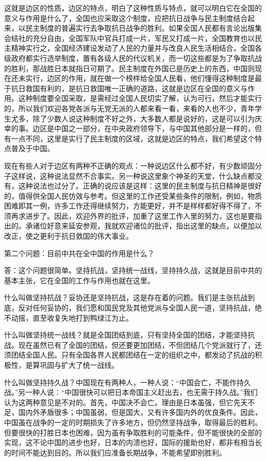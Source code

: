 这就是边区的性质，边区的特点，明白了这种性质与特点，就可以明白它在全国的意义与作用是什么了，全国也应采取这个制度，应把抗日战争与民主制度结合起来，以民主制度的普遍实行去争取抗日战争的胜利。如果全国人民都有言论出版集会结社的充分自由，全国军队中官兵打成一片，军民又打成一片，全国教育也以民主精神实行之，全国经济建设发动了人民的力量并与改良人民生活相结合，全国各级政府都实行选举制度，置有各级人民的代议机关，而一切这些都是为了争取抗战的胜利，那战胜日本就指日可期了。民主制度在外国已是历史上的东西，中国则现在还未实行，边区的作用，就在做一个榜样给全国人民看，他们懂得这种制度是最于抗日救国有利的，是抗日救国唯一正确的道路，这就是边区在全国的意义与作用。这种制度要全国采取，是需经过全国人民切实了解，认为可行，然后才能实行的，所以我们欢迎各党各派与无党无派的人都来看一看，来看的人也不少，青年学生尤多，除了少数人说这种制度不好之外，大多数人都是说好的，这是可以引为庆幸的事。边区是中国之一部分，在中央政府领导下，与中国其他部分是一样的，但有一点不同，这里是实行了民主制度的区域，这就是边区的特点，我们希望这个特点普及于中国。

现在有些人对于边区有两种不正确的观点：一种说边区什么都不好，有少数顽固分子这样说，这种说法显然不合事实。另一种说这里象个神圣的天堂，什么缺点都没有，这种说法也过分了。正确的说应该是这样：这里的民主制度与抗日精神是很好的，值得供全国人民仿效与参考。但这里的工作还受某些条件的限制，例如，物质困难即其一例，许多工作还得继续努力，方能更好，并不是样样都好得不得了，不须再求进步了。因此，欢迎外界的批评，加重了这里工作人里的努力，这也是要指出的。承诸位好意来延安参观，我就欢迎诸位的批评，指出这里的缺点，以便加以改正，使之更利于抗日救国的伟大事业。

第二个问题：目前中共在全中国的作用是什么？

答：这个问题很简单。坚持抗战，坚持统一战线，坚持持久战，这就是目前中共的基本主张，它在全国的工作与作用也就在这里。

什么叫做坚持抗战？妥协还是坚持抗战，这是存在着的问题。我们是主张抗战到底，反对任何妥协的，我们愿和国民党及其他党派与全国人民一道，坚持抗战，绝不动摇，直至收复失地打到鸭绿江为止。

什么叫做坚持统一战线？就是全国团结到底，只有坚持全国的团结，才能坚持抗战。现在虽然已有了全国的团结，但还要更加团结，不但团结几个党派就行了，还须团结全国人民。只有全国各界人民都团结在一定的组织之中，都发动了抗战的积极性，是算巩固与扩大了统一战线。

什么叫做坚持持久战？中国现在有两种人，一种人说：“中国会亡，不能作持久战。”另一种人说：“中国很快可以把日本帝国主义赶出去，也无需于持久战。”我们认为这两种意见是不对的。首先，中国决不会亡。理由是日本虽强，但它先天不足，国内外矛盾很多；中国虽弱，但是国大，又有许多国内外的优良条件。因此，中国虽在战争的一定的时期损失了许多地方，但仍然坚持战争，取得最后的胜利。但要很快的打胜日本也困难，因为虽有争取胜利的可能条件，但不能很快的全部的实现，这不论中国的进步也好，日本的内溃也好，国际的援助也好，都非有相当长的时间不能达到目的。所以我们应准备长期战争，不能希望即别胜利。


